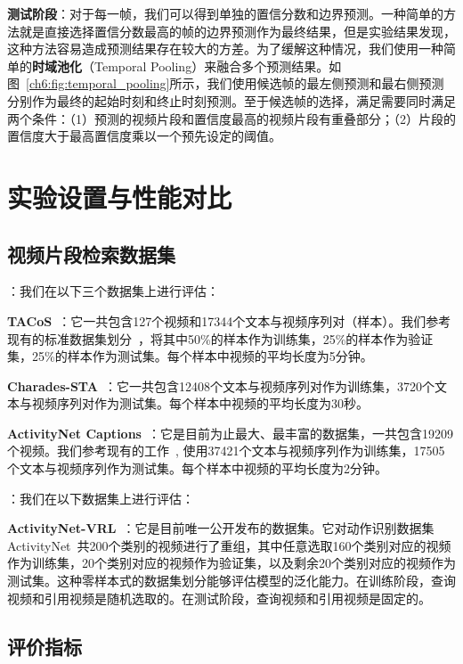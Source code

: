 \textbf{测试阶段}：对于每一帧，我们可以得到单独的置信分数和边界预测。一种简单的方法就是直接选择置信分数最高的帧的边界预测作为最终结果，但是实验结果发现，这种方法容易造成预测结果存在较大的方差。为了缓解这种情况，我们使用一种简单的\textbf{时域池化}（Temporal Pooling）来融合多个预测结果。如图~\ref{ch6:fig:temporal_pooling}所示，我们使用候选帧的最左侧预测和最右侧预测分别作为最终的起始时刻和终止时刻预测。至于候选帧的选择，满足需要同时满足两个条件：（1）预测的视频片段和置信度最高的视频片段有重叠部分；（2）片段的置信度大于最高置信度乘以一个预先设定的阈值。


\section{实验设置与性能对比}

\subsection{视频片段检索数据集}

\noindent\textbf{}：我们在以下三个数据集上进行评估：

\noindent\textbf{TACoS}~\cite{regneri2013grounding}：它一共包含127个视频和17344个文本与视频序列对（样本）。我们参考现有的标准数据集划分~\cite{gao2017tall}，将其中50\%的样本作为训练集，25\%的样本作为验证集，25\%的样本作为测试集。每个样本中视频的平均长度为5分钟。


\noindent\textbf{Charades-STA}~\cite{gao2017tall}：它一共包含12408个文本与视频序列对作为训练集，3720个文本与视频序列对作为测试集。每个样本中视频的平均长度为30秒。


\noindent\textbf{ActivityNet Captions}~\cite{krishna2017dense}：它是目前为止最大、最丰富的数据集，一共包含19209个视频。我们参考现有的工作~\cite{yuan2019find}, 使用37421个文本与视频序列作为训练集，17505个文本与视频序列作为测试集。每个样本中视频的平均长度为2分钟。


\noindent\textbf{}：我们在以下数据集上进行评估：

\noindent\textbf{ActivityNet-VRL}~\cite{feng2018video}：它是目前唯一公开发布的数据集。它对动作识别数据集ActivityNet~\cite{caba2015activitynet}共200个类别的视频进行了重组，其中任意选取160个类别对应的视频作为训练集，20个类别对应的视频作为验证集，以及剩余20个类别对应的视频作为测试集。这种零样本式的数据集划分能够评估模型的泛化能力。在训练阶段，查询视频和引用视频是随机选取的。在测试阶段，查询视频和引用视频是固定的。

\subsection{评价指标}


